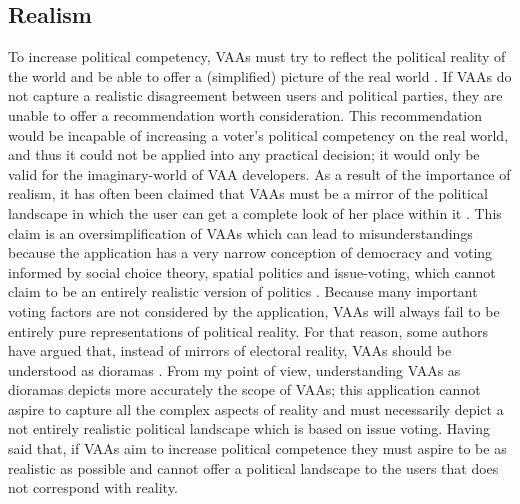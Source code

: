 \documentclass{scrartcl}
\begin{document}
\subsection{Realism}
To increase political competency, VAAs must try to reflect the political reality of the world and be able to offer a (simplified) picture of the real world \cite{dinas2014look}. If VAAs do not capture a realistic disagreement between users and political parties, they are unable to offer a recommendation worth consideration. This recommendation would be incapable of increasing a voter's political competency on the real world, and thus it could not be applied into any practical decision; it would only be valid for the imaginary-world of VAA developers. As a result of the importance of realism, it has often been claimed that VAAs must be a mirror of the political landscape in which the user can get a complete look of her place within it \cite{dinas2014look}. This claim is an oversimplification of VAAs which can lead to misunderstandings because the application has a very narrow conception of democracy and voting informed by social choice theory, spatial politics and issue-voting, which cannot claim to be an entirely realistic version of politics \cite{fossen2015electoral}. Because many important voting factors are not considered by the application, VAAs will always fail to be entirely pure representations of political reality. For that reason, some authors have argued that, instead of mirrors of electoral reality, VAAs should be understood as dioramas \cite{fossen2015electoral}. From my point of view, understanding VAAs as dioramas depicts more accurately the scope of VAAs; this application cannot aspire to capture all the complex aspects of reality and must necessarily depict a not entirely realistic political landscape which is based on issue voting. Having said that, if VAAs aim to increase political competence they must aspire to be as realistic as possible and cannot offer a political landscape to the users that does not correspond with reality.
\\
\end{document}
